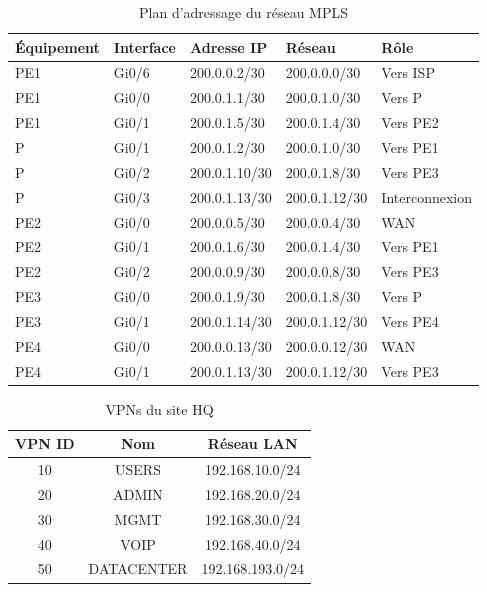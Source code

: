 \documentclass[12pt,a4paper,oneside]{report}
\begin{document}
	\begin{table}[H]
		\centering
		\caption{Plan d'adressage du réseau MPLS}
		\label{tab:mpls}
		
		\begin{tabular}{|p{2.5cm}|p{2cm}|p{3cm}|p{3cm}|p{3cm}|}
			\hline
			\textbf{Équipement} & \textbf{Interface} & \textbf{Adresse IP} & \textbf{Réseau} & \textbf{Rôle} \\
			\hline
			PE1 & Gi0/6 & 200.0.0.2/30 & 200.0.0.0/30 & Vers ISP \\
			\hline
			PE1 & Gi0/0 & 200.0.1.1/30 & 200.0.1.0/30 & Vers P \\
			\hline
			PE1 & Gi0/1 & 200.0.1.5/30 & 200.0.1.4/30 & Vers PE2 \\
			\hline
			P & Gi0/1 & 200.0.1.2/30 & 200.0.1.0/30 & Vers PE1 \\
			\hline
			P & Gi0/2 & 200.0.1.10/30 & 200.0.1.8/30 & Vers PE3 \\
			\hline
			P & Gi0/3 & 200.0.1.13/30 & 200.0.1.12/30 & Interconnexion \\
			\hline
			PE2 & Gi0/0 & 200.0.0.5/30 & 200.0.0.4/30 & WAN \\
			\hline
			PE2 & Gi0/1 & 200.0.1.6/30 & 200.0.1.4/30 & Vers PE1 \\
			\hline
			PE2 & Gi0/2 & 200.0.0.9/30 & 200.0.0.8/30 & Vers PE3 \\
			\hline
			PE3 & Gi0/0 & 200.0.1.9/30 & 200.0.1.8/30 & Vers P \\
			\hline
			PE3 & Gi0/1 & 200.0.1.14/30 & 200.0.1.12/30 & Vers PE4 \\
			\hline
			PE4 & Gi0/0 & 200.0.0.13/30 & 200.0.0.12/30 & WAN \\
			\hline
			PE4 & Gi0/1 & 200.0.1.13/30 & 200.0.1.12/30 & Vers PE3 \\
			\hline
		\end{tabular}
	\end{table}
	
	
	\begin{table}[H]
		\centering
		\caption{VPNs du site HQ}
		\label{tab:vpn-hq}
		
		\begin{tabular}{|c|c|c|}
			\hline
			\textbf{VPN ID} & \textbf{Nom} & \textbf{Réseau LAN} \\
			\hline
			10 & USERS & 192.168.10.0/24 \\
			\hline
			20 & ADMIN & 192.168.20.0/24 \\
			\hline
			30 & MGMT & 192.168.30.0/24 \\
			\hline
			40 & VOIP & 192.168.40.0/24 \\
			\hline
			50 & DATACENTER & 192.168.193.0/24 \\
			\hline
		\end{tabular}
	\end{table}
	
\end{document}
